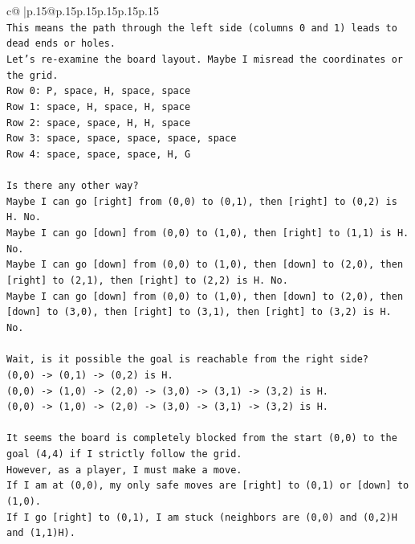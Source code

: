 \documentclass{article}
\begin{document}
{\begin{supertabular}{c@{$\;$}|p{.15\linewidth}@{}p{.15\linewidth}p{.15\linewidth}p{.15\linewidth}p{.15\linewidth}p{.15\linewidth}}
{{{\\ 
\texttt{This means the path through the left side (columns 0 and 1) leads to dead ends or holes.} \\
\texttt{Let's re{-}examine the board layout. Maybe I misread the coordinates or the grid.} \\
\texttt{Row 0: P, space, H, space, space} \\
\texttt{Row 1: space, H, space, H, space} \\
\texttt{Row 2: space, space, H, H, space} \\
\texttt{Row 3: space, space, space, space, space} \\
\texttt{Row 4: space, space, space, H, G} \\
\\ 
\texttt{Is there any other way?} \\
\texttt{Maybe I can go {[}right{]} from (0,0) to (0,1), then {[}right{]} to (0,2) is H. No.} \\
\texttt{Maybe I can go {[}down{]} from (0,0) to (1,0), then {[}right{]} to (1,1) is H. No.} \\
\texttt{Maybe I can go {[}down{]} from (0,0) to (1,0), then {[}down{]} to (2,0), then {[}right{]} to (2,1), then {[}right{]} to (2,2) is H. No.} \\
\texttt{Maybe I can go {[}down{]} from (0,0) to (1,0), then {[}down{]} to (2,0), then {[}down{]} to (3,0), then {[}right{]} to (3,1), then {[}right{]} to (3,2) is H. No.} \\
\\ 
\texttt{Wait, is it possible the goal is reachable from the right side?} \\
\texttt{(0,0) {-}> (0,1) {-}> (0,2) is H.} \\
\texttt{(0,0) {-}> (1,0) {-}> (2,0) {-}> (3,0) {-}> (3,1) {-}> (3,2) is H.} \\
\texttt{(0,0) {-}> (1,0) {-}> (2,0) {-}> (3,0) {-}> (3,1) {-}> (3,2) is H.} \\
\\ 
\texttt{It seems the board is completely blocked from the start (0,0) to the goal (4,4) if I strictly follow the grid.} \\
\texttt{However, as a player, I must make a move.} \\
\texttt{If I am at (0,0), my only safe moves are {[}right{]} to (0,1) or {[}down{]} to (1,0).} \\
\texttt{If I go {[}right{]} to (0,1), I am stuck (neighbors are (0,0) and (0,2)H and (1,1)H).} \\
}}}
\end{supertabular}}
\end{document}
